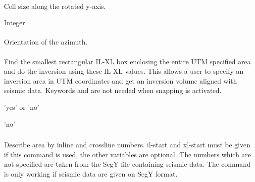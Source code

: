 \paragraph{}
 \slist
   \item \Description Cell size along the rotated y-axis.
   \item \Argument Integer
   \item \Default
 \elist

\paragraph{}
 \slist
   \item \Description Orientation of the azimuth.
   \item \Argument
   \item \Default
 \elist

\paragraph{}
\slist
   \item \Description Find the smallest rectangular IL-XL box
     enclosing the entire UTM specified area and do the inversion
     using these IL-XL values. This allows a user to specify an
     inversion area in UTM coordinates and get an inversion volume
     aligned with seismic data. Keywords 
     and  are not needed when snapping
     is activated.
   \item \Argument  'yes' or 'no'
   \item \Default 'no'
 \elist


\subsubsection{}
 \slist
   \item \Description Describe area by inline and crossline numbers. il-start and xl-start must be given if this command is used, the other variables are optional. The numbers which are not specified are taken from the SegY file containing seismic data. The command is only working if seismic data are given on SegY format.
   \item \Argument
   \item \Default
 \elist

